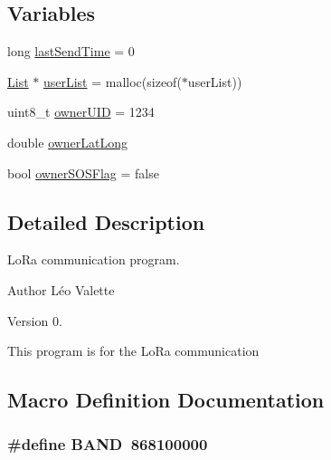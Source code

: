 \subsection*{Variables}
\begin{DoxyCompactItemize}
\item 
long \hyperlink{_lo_ra_ultra_team_8ino_a2843f69080a5607b99b835cc25627445}{last\+Send\+Time} = 0
\item 
\hyperlink{struct_list}{List} $\ast$ \hyperlink{_lo_ra_ultra_team_8ino_a3edc125d8fee7f95b109b750e6c1c57f}{user\+List} = malloc(sizeof($\ast$user\+List))
\item 
uint8\+\_\+t \hyperlink{_lo_ra_ultra_team_8ino_a4bb53245e79372c82896ffb28c181088}{owner\+U\+ID} = 1234
\item 
double \hyperlink{_lo_ra_ultra_team_8ino_a861d077f57e068df237e05627f16b2f7}{owner\+Lat\+Long}
\item 
bool \hyperlink{_lo_ra_ultra_team_8ino_a996122757c1d503a2ad0354b4244a3f5}{owner\+S\+O\+S\+Flag} = false
\end{DoxyCompactItemize}


\subsection{Detailed Description}
Lo\+Ra communication program. 

\begin{DoxyAuthor}{Author}
Léo Valette 
\end{DoxyAuthor}
\begin{DoxyVersion}{Version}
0.
\end{DoxyVersion}
This program is for the Lo\+Ra communication 

\subsection{Macro Definition Documentation}
\subsubsection[{\texorpdfstring{B\+A\+ND}{BAND}}]{\setlength{\rightskip}{0pt plus 5cm}\#define B\+A\+ND~868100000}\hypertarget{_lo_ra_ultra_team_8ino_ab57e5c97e5d788f048284f1175c757b7}{}\label{_lo_ra_ultra_team_8ino_ab57e5c97e5d788f048284f1175c757b7}
